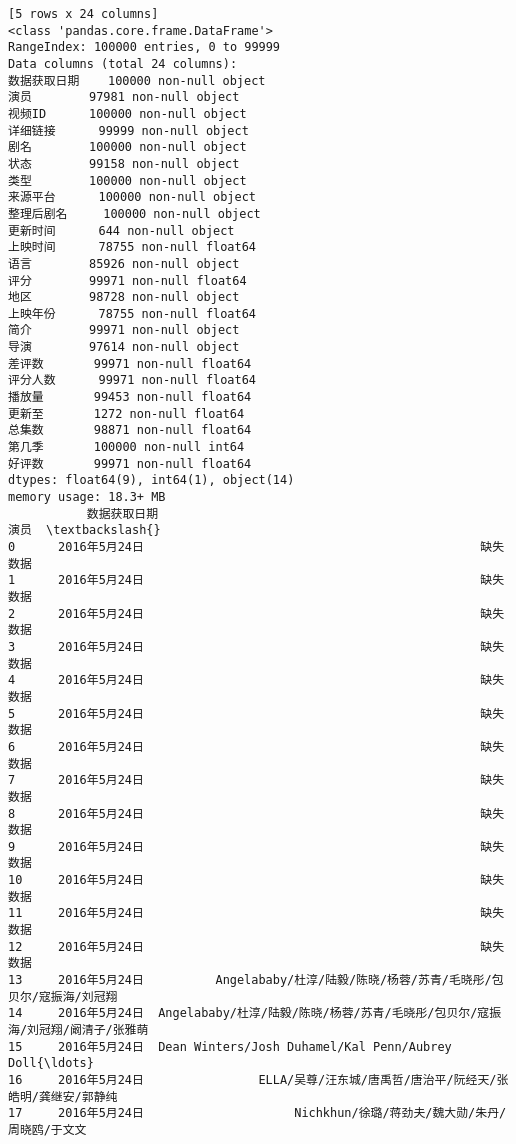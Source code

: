 \documentclass[11pt]{article}
\begin{document}
\begin{Verbatim}[commandchars=\\\{\}]
[5 rows x 24 columns]
<class 'pandas.core.frame.DataFrame'>
RangeIndex: 100000 entries, 0 to 99999
Data columns (total 24 columns):
数据获取日期    100000 non-null object
演员        97981 non-null object
视频ID      100000 non-null object
详细链接      99999 non-null object
剧名        100000 non-null object
状态        99158 non-null object
类型        100000 non-null object
来源平台      100000 non-null object
整理后剧名     100000 non-null object
更新时间      644 non-null object
上映时间      78755 non-null float64
语言        85926 non-null object
评分        99971 non-null float64
地区        98728 non-null object
上映年份      78755 non-null float64
简介        99971 non-null object
导演        97614 non-null object
差评数       99971 non-null float64
评分人数      99971 non-null float64
播放量       99453 non-null float64
更新至       1272 non-null float64
总集数       98871 non-null float64
第几季       100000 non-null int64
好评数       99971 non-null float64
dtypes: float64(9), int64(1), object(14)
memory usage: 18.3+ MB
           数据获取日期                                                 演员  \textbackslash{}
0      2016年5月24日                                               缺失数据   
1      2016年5月24日                                               缺失数据   
2      2016年5月24日                                               缺失数据   
3      2016年5月24日                                               缺失数据   
4      2016年5月24日                                               缺失数据   
5      2016年5月24日                                               缺失数据   
6      2016年5月24日                                               缺失数据   
7      2016年5月24日                                               缺失数据   
8      2016年5月24日                                               缺失数据   
9      2016年5月24日                                               缺失数据   
10     2016年5月24日                                               缺失数据   
11     2016年5月24日                                               缺失数据   
12     2016年5月24日                                               缺失数据   
13     2016年5月24日          Angelababy/杜淳/陆毅/陈晓/杨蓉/苏青/毛晓彤/包贝尔/寇振海/刘冠翔   
14     2016年5月24日  Angelababy/杜淳/陆毅/陈晓/杨蓉/苏青/毛晓彤/包贝尔/寇振海/刘冠翔/阚清子/张雅萌   
15     2016年5月24日  Dean Winters/Josh Duhamel/Kal Penn/Aubrey Doll{\ldots}   
16     2016年5月24日                ELLA/吴尊/汪东城/唐禹哲/唐治平/阮经天/张皓明/龚继安/郭静纯   
17     2016年5月24日                     Nichkhun/徐璐/蒋劲夫/魏大勋/朱丹/周晓鸥/于文文   

\end{Verbatim}
\end{document}
